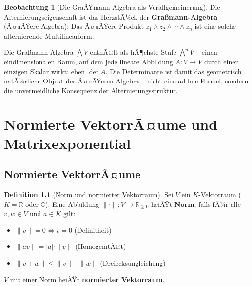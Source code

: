 ﻿\documentclass[a4paper,12pt]{report}
\theoremstyle{definition}
\newtheorem{definition}{Definition}
\newtheorem{beobachtung}{Beobachtung}
\begin{document}
\begin{beobachtung}[Die GraÃŸmann-Algebra als Verallgemeinerung]
    Die Alternierungseigenschaft ist das HerzstÃ¼ck der
    \textbf{Gra\ss{}mann-Algebra} (Ã¤uÃŸere Algebra): Das Ã¤uÃŸere Produkt
    $z_1 \wedge z_2 \wedge \cdots \wedge z_n$ ist eine solche
    alternierende Multilinearform.

    Die Gra\ss{}mann-Algebra $\bigwedge V$ enthÃ¤lt als hÃ¶chste Stufe
    $\bigwedge^n V$ -- einen eindimensionalen Raum, auf dem
    jede lineare Abbildung $A : V \to V$ durch einen einzigen Skalar
    wirkt: eben $\det A$. Die Determinante ist damit das
    geometrisch natÃ¼rliche Objekt der Ã¤uÃŸeren Algebra -- nicht
    eine ad-hoc-Formel, sondern die unvermeidliche Konsequenz der
    Alternierungsstruktur.
\end{beobachtung}

\chapter{Normierte VektorrÃ¤ume und Matrixexponential}

\section{Normierte VektorrÃ¤ume}

\begin{definition}[Norm und normierter Vektorraum]
    Sei $V$ ein $K$-Vektorraum ($K = \mathbb{R}$ oder $\mathbb{C}$).
    Eine Abbildung $\|\cdot\| : V \to \mathbb{R}_{\geq 0}$ heiÃŸt
    \textbf{Norm}, falls fÃ¼r alle $v, w \in V$ und $a \in K$ gilt:
    \begin{itemize}
        \item[-] $\|v\| = 0 \Leftrightarrow v = 0$ \quad (Definitheit)
        \item[-] $\|av\| = |a| \cdot \|v\|$ \quad (HomogenitÃ¤t)
        \item[-] $\|v + w\| \leq \|v\| + \|w\|$ \quad (Dreiecksungleichung)
    \end{itemize}
    $V$ mit einer Norm heiÃŸt \textbf{normierter Vektorraum}.
\end{definition}
\end{document}
